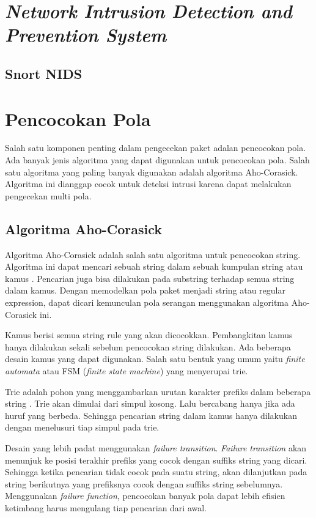 \section{\emph{Network Intrusion Detection and Prevention System}}

  \subsection{Snort NIDS}


\section{Pencocokan Pola}

  Salah satu komponen penting dalam pengecekan paket adalan pencocokan pola. Ada banyak jenis algoritma yang dapat digunakan untuk pencocokan pola. Salah satu algoritma yang paling banyak digunakan adalah algoritma Aho-Corasick. Algoritma ini dianggap cocok untuk deteksi intrusi karena dapat melakukan pengecekan multi pola.

  \subsection{Algoritma Aho-Corasick}

    Algoritma Aho-Corasick adalah salah satu algoritma untuk pencocokan string. Algoritma ini dapat mencari sebuah string dalam sebuah kumpulan string atau kamus \parencite{ahoc1975}. Pencarian juga bisa dilakukan pada substring terhadap semua string dalam kamus. Dengan memodelkan pola paket menjadi string atau regular expression, dapat dicari kemunculan pola serangan menggunakan algoritma Aho-Corasick ini.

    Kamus berisi semua string rule yang akan dicocokkan. Pembangkitan kamus hanya dilakukan sekali sebelum pencocokan string dilakukan. Ada beberapa desain kamus yang dapat digunakan. Salah satu bentuk yang umum yaitu \emph{finite automata} atau FSM (\emph{finite state machine}) yang menyerupai trie. 

    Trie adalah pohon yang menggambarkan urutan karakter prefiks dalam beberapa string \parencite{trie59}. Trie akan dimulai dari simpul kosong. Lalu bercabang hanya jika ada huruf yang berbeda. Sehingga pencarian string dalam kamus hanya dilakukan dengan menelusuri tiap simpul pada trie.

    Desain yang lebih padat menggunakan \emph{failure transition}. \emph{Failure transition} akan menunjuk ke posisi terakhir prefiks yang cocok dengan suffiks string yang dicari. Sehingga ketika pencarian tidak cocok pada suatu string, akan dilanjutkan pada string berikutnya yang prefiksnya cocok dengan suffiks string sebelumnya. Menggunakan \emph{failure function}, pencocokan banyak pola dapat lebih efisien ketimbang harus mengulang tiap pencarian dari awal. 

